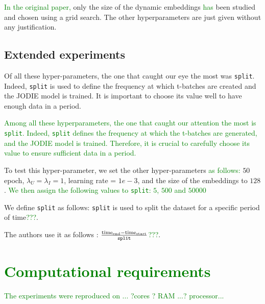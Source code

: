 \textcolor{green}{In the original paper, }only the size of the dynamic embeddings \textcolor{green}{has} %
been studied and chosen using a grid search. The other hyperparameters are just given without any justification.

\subsection{Extended experiments}


Of all these hyper-parameters, the one that caught our eye the most was \texttt{split}. Indeed, \texttt{split} is used to define the frequency at which t-batches are created and the JODIE model is trained. It is important to choose its value well to have enough data in a period. 

\textcolor{green}{Among all these hyperparameters, the one that caught our attention the most is \texttt{split}. Indeed, \texttt{split} defines the frequency at which the t-batches are generated, and the JODIE model is trained. Therefore, it is crucial to carefully choose its value to ensure sufficient data in a period. }

To test this hyper-parameter, we set the other hyper-parameters \textcolor{green}{as follows: }%
$50$ epoch, $\lambda_U = \lambda_I = 1$, learning rate = $1e-3$, and the size of the embeddings to $128$. \textcolor{green}{We then assign the following values to \texttt{split}: $5$, $500$ and $50000$}

We define \texttt{split} as follows:
\texttt{split} is used to split the dataset for a specific period of time\textcolor{green}{???}. 


The authors use it as follows : $\frac{\text{time}_{\text{end}} - \text{time}_{\text{start}}}{\text{\texttt{split}}}$\textcolor{green}{???}. 

\section{\textcolor{green}{Computational requirements}}
\textcolor{green}{The experiments were reproduced on ... ?cores ? RAM ...? processor...}



